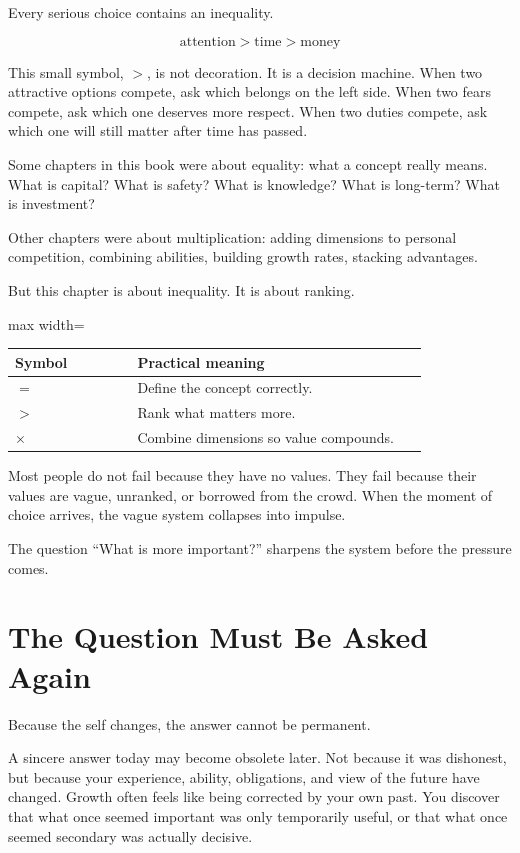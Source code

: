 Every serious choice contains an inequality.

\[
\text{attention} > \text{time} > \text{money}
\]

This small symbol, \(>\), is not decoration. It is a decision machine. When two attractive options compete, ask which belongs on the left side. When two fears compete, ask which one deserves more respect. When two duties compete, ask which one will still matter after time has passed.

Some chapters in this book were about equality: what a concept really means. What is capital? What is safety? What is knowledge? What is long-term? What is investment?

Other chapters were about multiplication: adding dimensions to personal competition, combining abilities, building growth rates, stacking advantages.

But this chapter is about inequality. It is about ranking.

\begin{center}
\begin{adjustbox}{max width=\linewidth}
\begin{tabular}{p{0.24\linewidth}p{0.58\linewidth}}
\hline
Symbol & Practical meaning \\
\hline
\(=\) & Define the concept correctly. \\
\(>\) & Rank what matters more. \\
\(\times\) & Combine dimensions so value compounds. \\
\hline
\end{tabular}
\end{adjustbox}
\end{center}

Most people do not fail because they have no values. They fail because their values are vague, unranked, or borrowed from the crowd. When the moment of choice arrives, the vague system collapses into impulse.

The question ``What is more important?'' sharpens the system before the pressure comes.

\section*{The Question Must Be Asked Again}

Because the self changes, the answer cannot be permanent.

A sincere answer today may become obsolete later. Not because it was dishonest, but because your experience, ability, obligations, and view of the future have changed. Growth often feels like being corrected by your own past. You discover that what once seemed important was only temporarily useful, or that what once seemed secondary was actually decisive.

